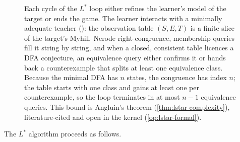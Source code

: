 \begin{figure}[ht]
\caption[The $L^*$ exact-learning loop]{Each cycle of the $L^*$ loop either refines the learner's model of the target or ends the game. The learner interacts with a minimally adequate teacher (): the observation table $(S,E,T)$ is a finite slice of the target's Myhill--Nerode right-congruence, membership queries fill it string by string, and when a closed, consistent table licences a DFA conjecture, an equivalence query either confirms it or hands back a counterexample that splits at least one equivalence class. Because the minimal DFA has $n$ states, the congruence has index $n$; the table starts with one class and gains at least one per counterexample, so the loop terminates in at most $n-1$ equivalence queries. This bound is Angluin's theorem (\cref{thm:lstar-complexity}), literature-cited and open in the kernel (\cref{op:lstar-formal}).}
\label{fig:lstar-protocol}
\end{figure}

The $L^*$ algorithm proceeds as follows.

